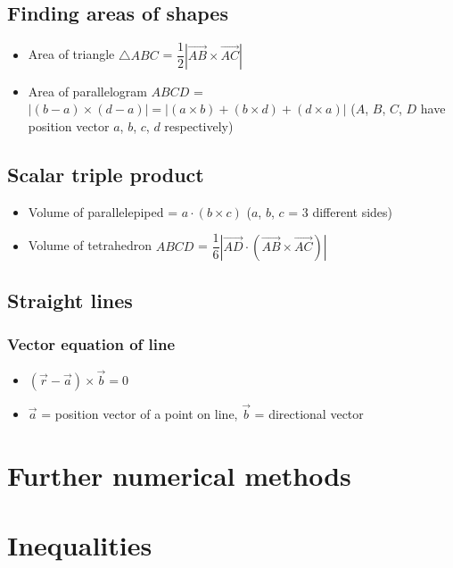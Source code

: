 \documentclass[11pt, A4paper]{article}
\begin{document}
	\subsection{Finding areas of shapes}
	\begin{itemize}
		\item Area of triangle $\bigtriangleup ABC$ = $\dfrac{1}{2}|\overrightarrow{AB}\times\overrightarrow{AC}|$
		\item Area of parallelogram $ABCD$ = $|(b-a) \times (d-a)|=|(a\times b)+(b \times d) + (d \times a)|$ ($A$, $B$, $C$, $D$ have position vector $a$, $b$, $c$, $d$ respectively)
	\end{itemize}
	\subsection{Scalar triple product}
	\begin{itemize}
		\item Volume of parallelepiped = $a\cdot(b\times c)$ ($a$, $b$, $c$ = 3 different sides)
		\item Volume of tetrahedron $ABCD$ = $\dfrac{1}{6}|\overrightarrow{AD}\cdot(\overrightarrow{AB}\times\overrightarrow{AC})|$
	\end{itemize}
	\subsection{Straight lines}
	\subsubsection{Vector equation of line}
	\begin{itemize}
		\item $(\vec{r}-\vec{a})\times\vec{b}=0$
		\item $\vec{a}$ = position vector of a point on line, $\vec{b}$ = directional vector
	\end{itemize}
	
	
	\section{Further numerical methods}
	\section{Inequalities}
\end{document}
